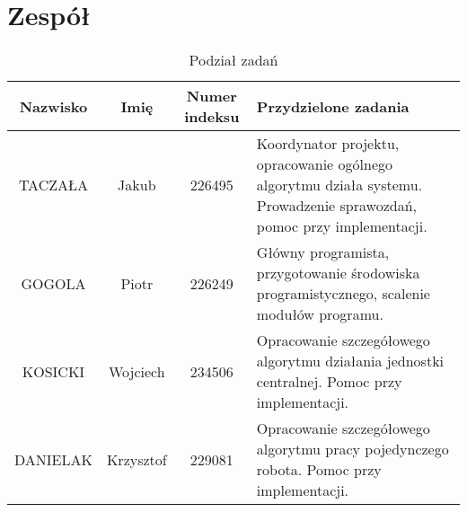 \section{Zespół}
\label{sec:zespol} %
\label{subsec:pozostali_czlonkowie_grupy}
\begin{table}[hbt]
\begin{center}
\begin{tabular}{|c|c|c|p{6.2cm}|} %
\hline
Nazwisko & Imię & Numer indeksu & Przydzielone zadania \\ \hline
TACZAŁA & Jakub & 226495 & Koordynator projektu,  opracowanie ogólnego algorytmu działa systemu. Prowadzenie sprawozdań, pomoc przy implementacji.\\ \hline
GOGOLA & Piotr & 226249 &  Główny programista, przygotowanie środowiska programistycznego, scalenie modułów programu.\\ \hline
KOSICKI & Wojciech & 234506 & Opracowanie szczegółowego algorytmu działania jednostki centralnej. Pomoc przy implementacji.\\ \hline
DANIELAK &Krzysztof& 229081 &  Opracowanie szczegółowego algorytmu pracy pojedynczego robota.  Pomoc przy implementacji.\\
\hline
\end{tabular}
\end{center}
\caption{\label{rj}Podział zadań} %
\end{table}
